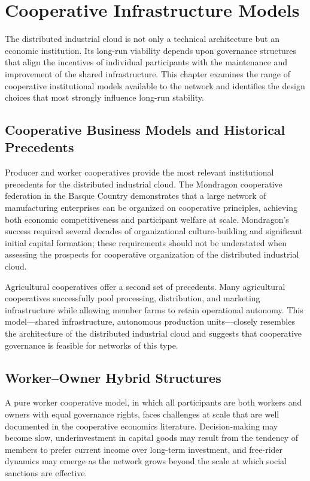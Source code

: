\documentclass[12pt]{book}
\theoremstyle{definition}
\theoremstyle{remark}
\begin{document}
\chapter{Cooperative Infrastructure Models}

The distributed industrial cloud is not only a technical architecture
but an economic institution. Its long-run viability depends upon
governance structures that align the incentives of individual
participants with the maintenance and improvement of the shared
infrastructure. This chapter examines the range of cooperative
institutional models available to the network and identifies the
design choices that most strongly influence long-run stability.

\section{Cooperative Business Models and Historical Precedents}

Producer and worker cooperatives provide the most relevant
institutional precedents for the distributed industrial cloud. The
Mondragon cooperative federation in the Basque Country demonstrates
that a large network of manufacturing enterprises can be organized
on cooperative principles, achieving both economic competitiveness
and participant welfare at scale. Mondragon's success required
several decades of organizational culture-building and significant
initial capital formation; these requirements should not be
understated when assessing the prospects for cooperative
organization of the distributed industrial cloud.

Agricultural cooperatives offer a second set of precedents. Many
agricultural cooperatives successfully pool processing, distribution,
and marketing infrastructure while allowing member farms to retain
operational autonomy. This model---shared infrastructure, autonomous
production units---closely resembles the architecture of the
distributed industrial cloud and suggests that cooperative governance
is feasible for networks of this type.

\section{Worker--Owner Hybrid Structures}

A pure worker cooperative model, in which all participants are
both workers and owners with equal governance rights, faces
challenges at scale that are well documented in the cooperative
economics literature. Decision-making may become slow, underinvestment
in capital goods may result from the tendency of members to prefer
current income over long-term investment, and free-rider dynamics
may emerge as the network grows beyond the scale at which social
sanctions are effective.
\end{document}
